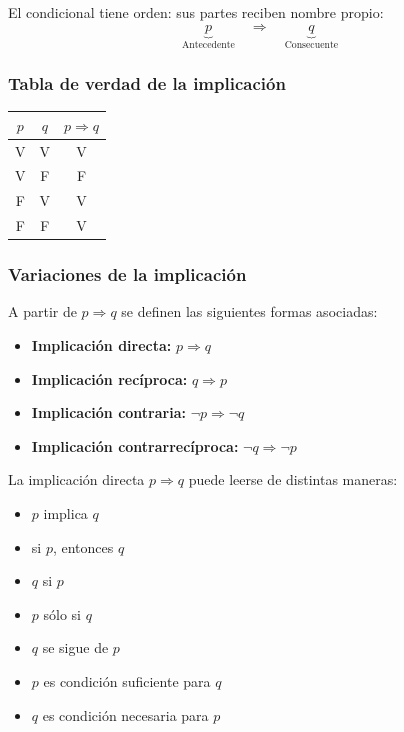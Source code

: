 El condicional tiene orden: sus partes reciben nombre propio:
\[
\underbrace{p}_{\text{Antecedente}}
\quad \Rightarrow \quad
\underbrace{q}_{\text{Consecuente}}
\]

\subsubsection*{Tabla de verdad de la implicación}
\begin{center}
    \renewcommand{\arraystretch}{1.4}
    \begin{tabular}{|c|c|c|}
        \hline
        \textbf{$p$} & \textbf{$q$} & \textbf{$p \Rightarrow q$} \\
        \hline
        V & V & V \\
        \hline
        V & F & F \\
        \hline
        F & V & V \\
        \hline
        F & F & V \\
        \hline
    \end{tabular}
\end{center}

\subsubsection*{Variaciones de la implicación}

A partir de $p \Rightarrow q$ se definen las siguientes formas asociadas:

\begin{itemize}
    \item \textbf{Implicación directa:} $p \Rightarrow q$
    \item \textbf{Implicación recíproca:} $q \Rightarrow p$
    \item \textbf{Implicación contraria:} $\lnot p \Rightarrow \lnot q$
    \item \textbf{Implicación contrarrecíproca:} $\lnot q \Rightarrow \lnot p$
\end{itemize}

La implicación directa $p \Rightarrow q$ puede leerse de distintas maneras:
\begin{itemize}
    \item $p$ implica $q$
    \item si $p$, entonces $q$
    \item $q$ si $p$
    \item $p$ sólo si $q$
    \item $q$ se sigue de $p$
    \item $p$ es condición suficiente para $q$
    \item $q$ es condición necesaria para $p$
\end{itemize}

